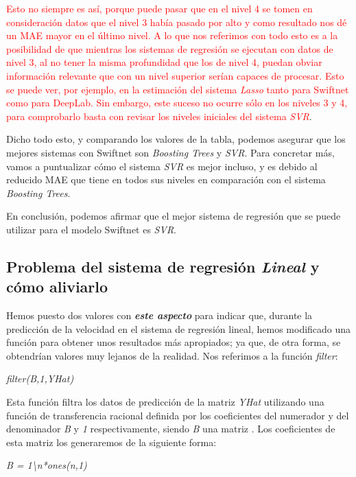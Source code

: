 \textcolor{Red}{Esto no siempre es así, porque puede pasar que en el nivel 4 se tomen en consideración datos que el nivel 3 había pasado por alto y como resultado nos dé un \ac{MAE} mayor en el último nivel. A lo que nos referimos con todo esto es a la posibilidad de que mientras los sistemas de regresión se ejecutan con datos de nivel 3, al no tener la misma profundidad que los de nivel 4, puedan obviar información relevante que con un nivel superior serían capaces de procesar. Esto se puede ver, por ejemplo, en la estimación del sistema \textit{Lasso} tanto para Swiftnet como para DeepLab. Sin embargo, este suceso no ocurre sólo en los niveles 3 y 4, para comprobarlo basta con revisar los niveles iniciales del sistema \textit{\ac{SVR}}}.

Dicho todo esto, y comparando los valores de la tabla, podemos asegurar que los mejores sistemas con Swiftnet son \textit{Boosting Trees} y \textit{\ac{SVR}}. Para concretar más, vamos a puntualizar cómo el sistema \textit{\ac{SVR}} es mejor incluso, y es debido al reducido \ac{MAE} que tiene en todos sus niveles en comparación con el sistema \textit{Boosting Trees}.

En conclusión, podemos afirmar que el mejor sistema de regresión que se puede utilizar para el modelo Swiftnet es \textit{\ac{SVR}}.

\subsection{Problema del sistema de regresión \textit{Lineal} y cómo aliviarlo}

Hemos puesto dos valores con \textit{\textbf{este aspecto}} para indicar que, durante la predicción de la velocidad en el sistema de regresión lineal, hemos modificado una función para obtener unos resultados más apropiados; ya que, de otra forma, se obtendrían valores muy lejanos de la realidad. Nos referimos a la función \textit{filter}:

\begin{center}
\textit{filter(B,1,YHat)}
\end{center}

Esta función filtra los datos de predicción de la matriz \textit{YHat} utilizando una función de transferencia racional definida por los coeficientes del numerador y del denominador \textit{B} y \textit{1} respectivamente, siendo \textit{B} una matriz \cite{filter}. Los coeficientes de esta matriz los generaremos de la siguiente forma:

\begin{center}
\textit{B = 1\textbackslash{n}*ones(n,1)}
\end{center}

